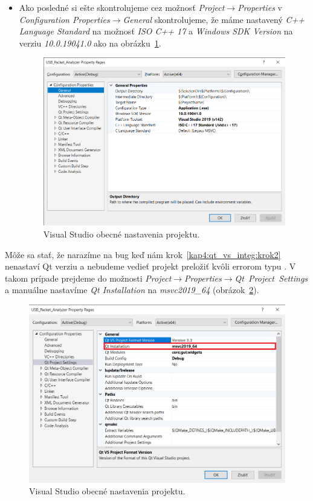 \begin{itemize}
\item Ako posledné si ešte skontrolujeme cez možnosť \textit{Project}$\rightarrow$\textit{Properties} v \textit{Configuration Properties}$\rightarrow$\textit{General} skontrolujeme, že máme nastavený \textit{C++ Language Standard} na možnosť \textit{ISO C++ 17} a \textit{Windows SDK Version} na verziu \textit{10.0.19041.0} ako na obrázku~\ref{obr:kap4:vs_prop}.

\begin{figure}[!htb]
	\centering
	\includegraphics[width=12cm]{img/kap04_vs_prop}
	\caption{Visual Studio obecné nastavenia projektu.}
	\label{obr:kap4:vs_prop}
\end{figure}

\end{itemize}

Môže sa stať, že narazíme na bug keď nám krok~\ref{kap4:qt_vs_integ:krok2} nenastaví Qt verziu a nebudeme vedieť projekt preložiť kvôli errorom typu . V takom prípade prejdeme do možnosti \textit{Project}$\rightarrow$\textit{Properties}$\rightarrow$\textit{Qt~Project~Settings} a manuálne nastavíme \textit{Qt Installation} na \textit{msvc2019\_64} (obrázok~\ref{obr:kap4:vs_manual}).

\begin{figure}[!htb]
	\centering
	\includegraphics[width=12cm]{img/kap04_vs_manual}
	\caption{Visual Studio obecné nastavenia projektu.}
	\label{obr:kap4:vs_manual}
\end{figure}

